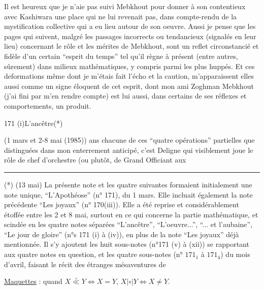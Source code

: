 Il est heureux que je n'aie pas suivi Mebkhout\deleted{\unsure{,}} pour donner à son contentieux avec Kashiwara une place qui ne lui revenait pas, dans   compte-rendu de la mystification collective  qui a eu lieu autour de son oeuvre. Aussi je pense que les pages qui suivent, malgré les passages incorrects ou tendancieux (signalés en leur lieu) concernant le rôle et les mérites de Mebkhout,  sont  un reflet circonstancié et fidèle d'un certain ``esprit du temps'' tel qu'il règne à présent (entre autres, sûrement) dans   milieux mathématiques, y compris parmi les plus huppés. \handwritten{\unsure{(}}Et ces deformations même dont je m'étais fait l'écho et la caution, m'apparaissent elles aussi comme un signe éloquent de cet esprit, dont mon ami Zoghman Mebkhout\deleted{\unsure{,}}  (j'ai fini par m'en rendre compte)  est lui aussi, dans certains de ses réflexes et comportements, un produit.

\handwritten{(}171 (i)\handwritten{)}\quad L'ancêtre\quad (*)

(1 mars et 2-8 mai (1985))  ans chacune de ces ``quatre opérations'' partielles que  distinguées dans mon enterrement anticipé, c'est Deligne qui visiblement joue le rôle de chef d'orchestre (ou plutôt, de Grand Officiant aux

\noindent\rule{2cm}{0.4pt}

(*\deleted{\unsure{*}}) (13 mai) La présente note et les quatre suivantes formaient initialement une note unique, ``L'Apothéose'' (n° 171), du 1 mars. Elle incluait également la note précédente ``Les joyaux'' (n° 170(iii)). Elle a été reprise et considérablement étoffée entre les 2 et 8 mai, surtout en ce qui concerne la partie mathématique, et scindée en les quatre notes séparées ``L'ancêtre'', ``L'oeuvre...'', ``... et l'aubaine'', ``Le jour de gloire'' (n°s 171 (i) à (iv)), en plus de la note ``Les joyaux'' déjà mentionnée. Il s'y ajoutent les huit sous-notes (n°171 (v) à (xii)) se rapportant aux quatre notes en question, et les quatre sous-notes (n° $171_1$ à $171_4$) du mois d'avril, faisant le récit des étranges mésaventures de

\uline{Maquettes} \uline{} : quand $X\overset{\circ}{\ll}Y\Longleftrightarrow X=Y$, $X|\circ|Y\Longleftrightarrow X\ne Y$.

